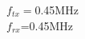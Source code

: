 \documentclass[preview]{standalone}
\begin{document}
\begin{center}
$f_{tx}=$0.45MHz\\$f_{rx}$=0.45MHz
\end{center}
\end{document}
